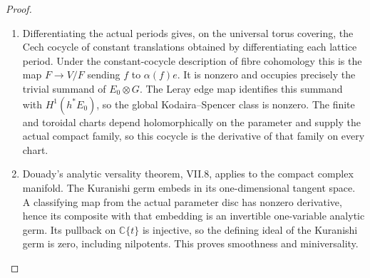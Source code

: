 \documentclass[11pt,a4paper]{article}
\theoremstyle{definition}
\begin{document}
\begin{proof}
\begin{enumerate}[label=\arabic*.]
\item Differentiating the actual periods gives, on the universal
torus covering, the Cech cocycle of constant translations
obtained by differentiating each lattice period. Under the
constant-cocycle description of fibre cohomology this is
the map $F\to V/F$ sending $f$ to $\alpha(f)e$.
It is nonzero and occupies precisely the trivial summand
of $E_0\otimes G$. The Leray edge map identifies this summand
with $H^1(h^*E_0)$, so the global Kodaira--Spencer class is
nonzero. The finite and toroidal charts depend holomorphically
on the parameter and supply the actual compact family,
so this cocycle is the derivative of that family on every chart.

\item Douady's analytic versality theorem, VII.8, applies to the
compact complex manifold. The Kuranishi germ embeds in its
one-dimensional tangent space. A classifying map from the
actual parameter disc has nonzero derivative, hence its
composite with that embedding is an invertible one-variable
analytic germ. Its pullback on $\mathbb C\{t\}$ is injective,
so the defining ideal of the Kuranishi germ is zero, including
nilpotents. This proves smoothness and miniversality.

\end{enumerate}
\end{proof}
\end{document}
